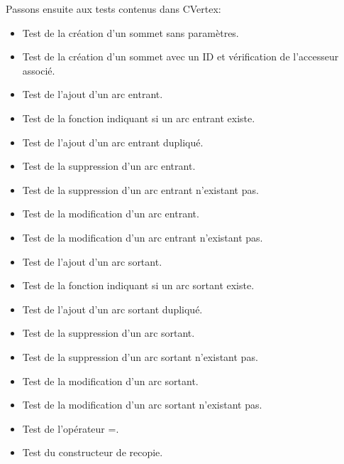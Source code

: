 		Passons ensuite aux tests contenus dans CVertex:
		\begin{itemize}
			\item Test de la création d'un sommet sans paramètres.
			\item Test de la création d'un sommet avec un ID et vérification de l'accesseur associé.
			\item Test de l'ajout d'un arc entrant.
			\item Test de la fonction indiquant si un arc entrant existe.
			\item Test de l'ajout d'un arc entrant dupliqué.
			\item Test de la suppression d'un arc entrant.
			\item Test de la suppression d'un arc entrant n'existant pas.
			\item Test de la modification d'un arc entrant.
			\item Test de la modification d'un arc entrant n'existant pas.
			\item Test de l'ajout d'un arc sortant.
			\item Test de la fonction indiquant si un arc sortant existe.
			\item Test de l'ajout d'un arc sortant dupliqué.
			\item Test de la suppression d'un arc sortant.
			\item Test de la suppression d'un arc sortant n'existant pas.
			\item Test de la modification d'un arc sortant.
			\item Test de la modification d'un arc sortant n'existant pas.
			\item Test de l'opérateur =.
			\item Test du constructeur de recopie.
		\end{itemize}
		
